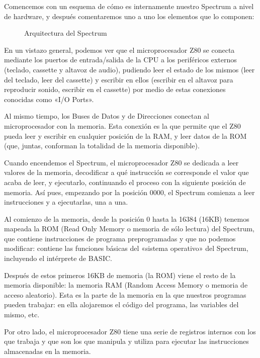 \documentclass[letterpaper,10pt,spanish]{sphinxmanual}
\begin{document}
Comencemos con un esquema de cómo es internamente nuestro Spectrum a nivel de hardware, y después comentaremos uno a uno los elementos que lo componen:

\begin{figure}[htbp]
\centering
\capstart

\noindent{}
\caption{Arquitectura del Spectrum}\label{\detokenize{03_arquitectura/arquitectura:id1}}\end{figure}

En un vistazo general, podemos ver que el microprocesador Z80 se conecta mediante los puertos de entrada/salida de la CPU a los periféricos externos (teclado, cassette y altavoz de audio), pudiendo leer el estado de los mismos (leer del teclado, leer del cassette) y escribir en ellos (escribir en el altavoz para reproducir sonido, escribir en el cassette) por medio de estas conexiones conocidas como «I/O Ports».

Al mismo tiempo, los Buses de Datos y de Direcciones conectan al microprocesador con la memoria. Esta conexión es la que permite que el Z80 pueda leer y escribir en cualquier posición de la RAM, y leer datos de la ROM (que, juntas, conforman la totalidad de la memoria disponible).

Cuando encendemos el Spectrum, el microprocesador Z80 se dedicada a leer valores de la memoria, decodificar a qué instrucción se corresponde el valor que acaba de leer, y ejecutarlo, continuando el proceso con la siguiente posición de memoria. Así pues, empezando por la posición 0000, el Spectrum comienza a leer instrucciones y a ejecutarlas, una a una.

Al comienzo de la memoria, desde la posición 0 hasta la 16384 (16KB) tenemos mapeada la ROM (Read Only Memory o memoria de sólo lectura) del Spectrum, que contiene instrucciones de programa preprogramadas y que no podemos modificar: contiene las funciones básicas del «sistema operativo» del Spectrum, incluyendo el intérprete de BASIC.

Después de estos primeros 16KB de memoria (la ROM) viene el resto de la memoria disponible: la memoria RAM (Random Access Memory o memoria de acceso aleatorio). Esta es la parte de la memoria en la que nuestros programas pueden trabajar: en ella alojaremos el código del programa, las variables del mismo, etc.

Por otro lado, el microprocesador Z80 tiene una serie de registros internos con los que trabaja y que son los que manipula y utiliza para ejecutar las instrucciones almacenadas en la memoria.
\end{document}
